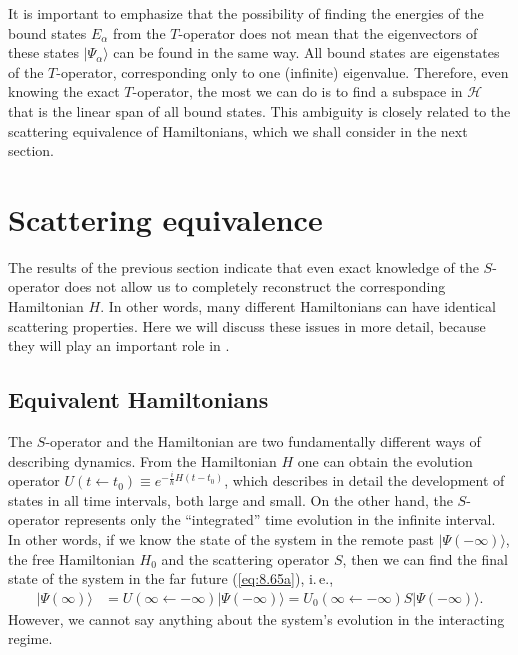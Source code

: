 \documentclass[]{stefan1}
\begin{document}
It is important to emphasize that the possibility of finding the
energies of the bound states $ E _{\alpha } $ from the $ T $-operator
does not mean that the eigenvectors of these states $ | \Psi_{\alpha
} \rangle $ can be found in the same way. All bound states are
eigenstates of the $ T $-operator, corresponding only to one (infinite)
eigenvalue. Therefore, even knowing the exact $ T $-operator, the most
we can do is to find a subspace in $ \mathscr{H} $ that is the linear
span of all bound states. This ambiguity is closely related to the
scattering equivalence of Hamiltonians, which we shall consider in the
next section.

\section{Scattering equivalence}\label{sc:scatt-equiv}
The results of the previous section indicate that even exact knowledge
of the $ S $-opera\-tor does not allow us to completely reconstruct the
corresponding Hamiltonian $ H $. In other words, many different
Hamiltonians can have identical scattering properties. Here we will
discuss these issues in more detail, because they will play an important
role in .

\subsection{Equivalent Hamiltonians}\label{ss:scatt-equiv}
The $ S $-operator and the Hamiltonian are two fundamentally different
ways of describing dynamics. From the Hamiltonian $ H $ one can obtain
the evolution operator $ U (t \gets t_{0}) \equiv e ^{- \frac{i}{
\hbar } H (t-t_{0})} $, which describes in detail the development of
states in all time intervals, both large and small. On the other hand,
the $ S $-operator represents only the ``integrated'' time evolution in
the infinite interval. In other words, if we know the state of the
system in the remote past $ | \Psi (- \infty ) \rangle $, the free
Hamiltonian $ H_{0} $ and the scattering operator $ S $, then we can
find the final state of the system in the far future (\ref{eq:8.65a}),
i.\,e.,
%
\begin{align*}
|\Psi (\infty ) \rangle &= U(\infty \gets -\infty ) |\Psi (-\infty ) \rangle =
U_{0}(\infty \gets -\infty ) S |\Psi (-\infty ) \rangle .
\end{align*}
However, we cannot say anything about the system's evolution in the
interacting regime.
\end{document}

